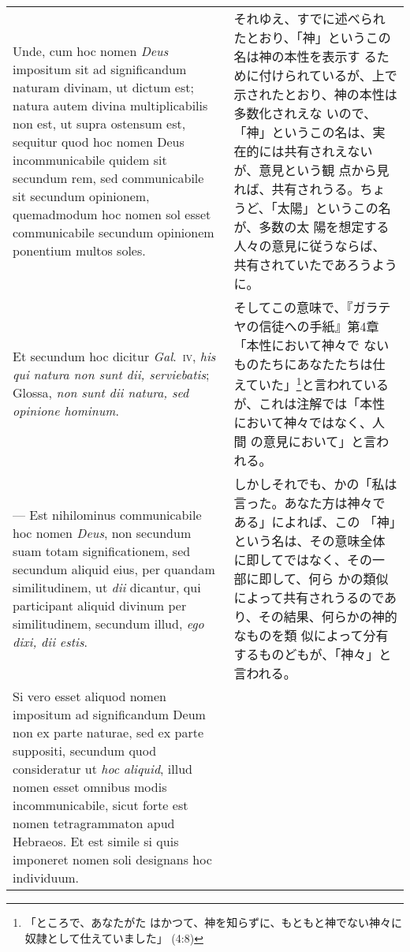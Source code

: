 \documentclass[10pt]{jsarticle} %
\begin{document}
\begin{longtable}{p{21em}p{21em}}
\\



Unde, cum hoc nomen {\itshape Deus} impositum sit ad significandum
naturam divinam, ut dictum est; natura autem divina multiplicabilis
non est, ut supra ostensum est, sequitur quod hoc nomen Deus
incommunicabile quidem sit secundum rem, sed communicabile sit
secundum opinionem, quemadmodum hoc nomen sol esset communicabile
secundum opinionem ponentium multos soles.


&

それゆえ、すでに述べられたとおり、「神」というこの名は神の本性を表示す
るために付けられているが、上で示されたとおり、神の本性は多数化されえな
いので、「神」というこの名は、実在的には共有されえないが、意見という観
点から見れば、共有されうる。ちょうど、「太陽」というこの名が、多数の太
陽を想定する人々の意見に従うならば、共有されていたであろうように。

\\

Et secundum hoc dicitur {\itshape Gal}.~{\scshape iv}, {\itshape his
qui natura non sunt dii, serviebatis}; Glossa, {\itshape non sunt dii
natura, sed opinione hominum}.

&

そしてこの意味で、『ガラテヤの信徒への手紙』第4章「本性において神々で
ないものたちにあなたたちは仕えていた」\footnote{「ところで、あなたがた
はかつて、神を知らずに、もともと神でない神々に奴隷として仕えていました」
(4:8)}と言われているが、これは注解では「本性において神々ではなく、人間
の意見において」と言われる。

\\

--- Est nihilominus communicabile hoc nomen {\itshape Deus}, non
secundum suam totam significationem, sed secundum aliquid eius, per
quandam similitudinem, ut {\itshape dii} dicantur, qui participant
aliquid divinum per similitudinem, secundum illud, {\itshape ego dixi,
dii estis}.


&

しかしそれでも、かの「私は言った。あなた方は神々である」によれば、この
「神」という名は、その意味全体に即してではなく、その一部に即して、何ら
かの類似によって共有されうるのであり、その結果、何らかの神的なものを類
似によって分有するものどもが、「神々」と言われる。

\\




Si vero esset aliquod nomen impositum ad significandum Deum non ex parte
naturae, sed ex parte suppositi, secundum quod consideratur ut {\itshape
hoc aliquid}, illud nomen esset omnibus modis incommunicabile, sicut
forte est nomen tetragrammaton apud Hebraeos. Et est simile si quis
imponeret nomen soli designans hoc individuum.


\end{longtable}
\end{document}
